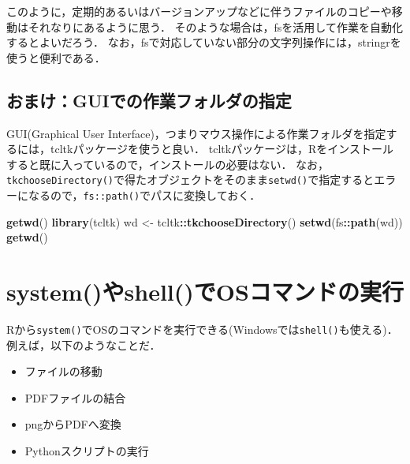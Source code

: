 \documentclass[
]{article}
\newenvironment{Shaded}{\begin{snugshade}}{\end{snugshade}}
\newcommand{\FunctionTok}[1]{\textcolor[rgb]{0.13,0.29,0.53}{\textbf{#1}}}
\newcommand{\NormalTok}[1]{#1}
\newcommand{\OtherTok}[1]{\textcolor[rgb]{0.56,0.35,0.01}{#1}}
\newcommand{\SpecialCharTok}[1]{\textcolor[rgb]{0.81,0.36,0.00}{\textbf{#1}}}
\providecommand{\tightlist}{%
  \setlength{\itemsep}{0pt}\setlength{\parskip}{0pt}}
\begin{document}
このように，定期的あるいはバージョンアップなどに伴うファイルのコピーや移動はそれなりにあるように思う．
そのような場合は，fsを活用して作業を自動化するとよいだろう．
なお，fsで対応していない部分の文字列操作には，stringrを使うと便利である．

\hypertarget{ux304aux307eux3051guiux3067ux306eux4f5cux696dux30d5ux30a9ux30ebux30c0ux306eux6307ux5b9a}{%
\subsection{おまけ：GUIでの作業フォルダの指定}\label{ux304aux307eux3051guiux3067ux306eux4f5cux696dux30d5ux30a9ux30ebux30c0ux306eux6307ux5b9a}}

GUI(Graphical User Interface)，つまりマウス操作による作業フォルダを指定するには，tcltkパッケージを使うと良い．
tcltkパッケージは，Rをインストールすると既に入っているので，インストールの必要はない．
なお，\texttt{tkchooseDirectory()}で得たオブジェクトをそのまま\texttt{setwd()}で指定するとエラーになるので，\texttt{fs::path()}でパスに変換しておく．

\begin{Shaded}
\begin{Highlighting}[]
\FunctionTok{getwd}\NormalTok{()}
\FunctionTok{library}\NormalTok{(tcltk)}
\NormalTok{wd }\OtherTok{\textless{}{-}}\NormalTok{ tcltk}\SpecialCharTok{::}\FunctionTok{tkchooseDirectory}\NormalTok{()}
\FunctionTok{setwd}\NormalTok{(fs}\SpecialCharTok{::}\FunctionTok{path}\NormalTok{(wd))}
\FunctionTok{getwd}\NormalTok{()}
\end{Highlighting}
\end{Shaded}

\hypertarget{shell}{%
\section{system()やshell()でOSコマンドの実行}\label{shell}}

Rから\texttt{system()}でOSのコマンドを実行できる(Windowsでは\texttt{shell()}も使える)．
例えば，以下のようなことだ．

\begin{itemize}
\tightlist
\item
  ファイルの移動\\
\item
  PDFファイルの結合\\
\item
  pngからPDFへ変換\\
\item
  Pythonスクリプトの実行
\end{itemize}
\end{document}
